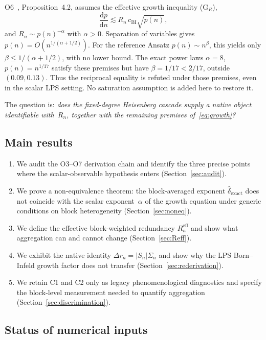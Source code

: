 \documentclass[11pt,a4paper]{article}
\newcommand{\Rn}{R_n}
\newcommand{\dexact}{\hat{\delta}_{\mathrm{exact}}}
\newcommand{\Reff}{R_n^{\mathrm{eff}}}
\begin{document}
O6~\cite{Beau2026a10}, Proposition~4.2, assumes the effective growth inequality (G$_R$),
\begin{equation}
\label{eq:growth}
\frac{\mathrm{d}p}{\mathrm{d}n}
\lesssim \Rn\,c_{\mathrm{BI}}\sqrt{p(n)},
\end{equation}
and $\Rn\sim p(n)^{-\alpha}$ with $\alpha>0$.
Separation of variables gives $p(n)=O(n^{1/(\alpha+1/2)})$.
For the reference Ansatz $p(n)\sim n^\beta$, this yields only
$\beta\leq1/(\alpha+1/2)$, with no lower bound.
The exact power laws $\alpha=8$, $p(n)=n^{1/17}$ satisfy these premises but have
$\beta=1/17<2/17$, outside $(0.09,0.13)$.
Thus the reciprocal equality is refuted under those premises, even in the scalar LPS setting.
No saturation assumption is added here to restore it.

The question is: \emph{does the fixed-degree Heisenberg cascade supply a native object
identifiable with~$\Rn$, together with the remaining premises of~\eqref{eq:growth}?}

\subsection{Main results}
\label{sec:mainresults}

\begin{enumerate}[label=(\arabic*)]
\item We audit the O3--O7 derivation chain and identify the three
precise points where the scalar-observable hypothesis enters
(Section~\ref{sec:audit}).
\item We prove a non-equivalence theorem: the block-averaged exponent
$\dexact$ does not coincide with the scalar exponent~$\alpha$ of the
growth equation under generic conditions on block heterogeneity
(Section~\ref{sec:noneq}).
\item We define the effective block-weighted redundancy $\Reff$ and show what aggregation
can and cannot change
(Section~\ref{sec:Reff}).
\item We exhibit the native identity $\Delta r_n=|S_n|\Sigma_n$ and show why the LPS
Born--Infeld growth factor does not transfer (Section~\ref{sec:rederivation}).
\item We retain C1 and C2 only as legacy phenomenological diagnostics and specify the
block-level measurement needed to quantify aggregation (Section~\ref{sec:discrimination}).
\end{enumerate}

\subsection{Status of numerical inputs}
\label{sec:reproducibility}
\end{document}
